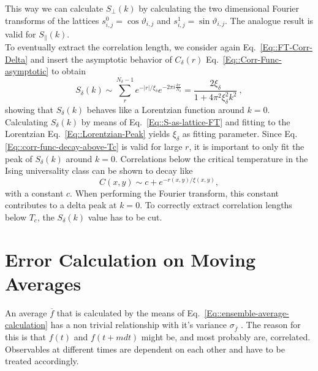 	This way we can calculate $S_\perp(k)$ by calculating the two dimensional Fourier transforms of the lattices $s_{i,j}^0 = \cos \vartheta_{i,j}	$ and $s_{i,j}^1 =	\sin \vartheta_{i,j}$.
	The analogue result is valid for $S_\parallel(k)$. \\
	
	To eventually extract the correlation length, we consider again Eq.~\eqref{Eq::FT-Corr-Delta} and insert the asymptotic behavior of $C_\delta (r)$  Eq.~\eqref{Eq::Corr-Func-asymptotic} to obtain
	\begin{equation} \label{Eq::Lorentzian-Peak}
		S_\delta(k) \sim \sum_r^{N_\delta - 1} e^{-|r| /	\xi_\delta} e^{-2\pi i \frac{kr}{N_\delta}} = \frac{2 \xi_\delta}{1 + 4 \pi^2 \xi_\delta^2 k^2}	~,
	\end{equation}
	showing that $S_\delta(k)$ behaves like a Lorentzian function around $k=0$. Calculating $S_\delta(k)$ by means of Eq.~\eqref{Eq::S-as-lattice-FT} and fitting to the Lorentzian Eq.~\eqref{Eq::Lorentzian-Peak} yields $\xi_\delta$ as fitting parameter. Since Eq. \eqref{Eq::corr-func-decay-above-Tc} is valid for large $r$, it is important to only fit the peak of $S_\delta(k)$ around $k = 0$. Correlations below the critical temperature in the Ising universality class can be shown \cite{mccoy1973two} to decay like
	\begin{equation}
		C(x, y) \sim  c + e^{-r(x,y) /	\xi(x,y)},
	\end{equation}
	with a constant $c$. When performing the Fourier transform, this constant contributes to a delta peak at $k = 0$. To correctly extract correlation lengths below $T_c$, the $S_\delta(k)$ value has to be cut.	
	\section{Error Calculation on Moving Averages} \label{Section::Error-Calc}	
	An average $\overline{f}$ that is calculated by the means of Eq.~\eqref{Eq::ensemble-average-calculation} has a non trivial relationship with it's variance $\sigma_{\overline{f}}$ \cite{madras1988pivot}. The reason for this is that $f(t)$ and $f(t + mdt)$ might be, and most probably are, correlated. Observables at different times are dependent on each other  and have to be treated accordingly. \\
	
